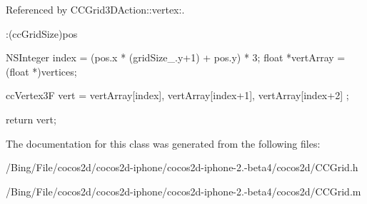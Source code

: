 Referenced by C\-C\-Grid3\-D\-Action\-::vertex\-:.


\begin{DoxyCode}
                   :(ccGridSize)pos
{
        NSInteger index = (pos.x * (gridSize_.y+1) + pos.y) * 3;
        float *vertArray = (float *)vertices;

        ccVertex3F      vert = { vertArray[index], vertArray[index+1], 
      vertArray[index+2] };

        return vert;
}
\end{DoxyCode}


The documentation for this class was generated from the following files\-:\begin{DoxyCompactItemize}
\item 
/\-Bing/\-File/cocos2d/cocos2d-\/iphone/cocos2d-\/iphone-\/2.-\/beta4/cocos2d/C\-C\-Grid.\-h\item 
/\-Bing/\-File/cocos2d/cocos2d-\/iphone/cocos2d-\/iphone-\/2.-\/beta4/cocos2d/C\-C\-Grid.\-m\end{DoxyCompactItemize}
